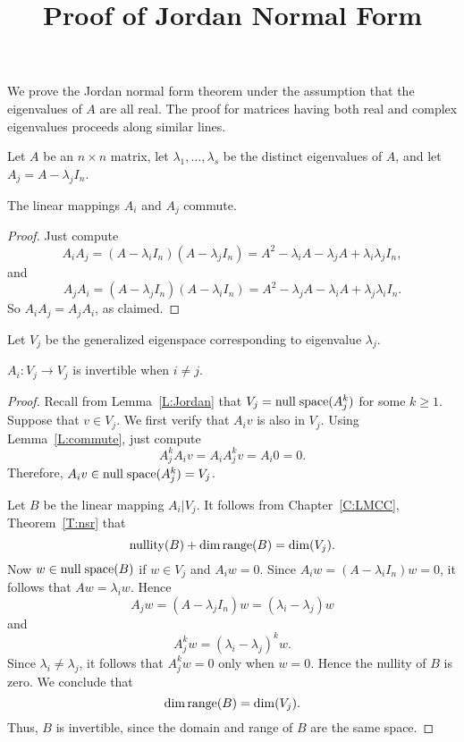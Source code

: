 \documentclass{ximera}
\title{Proof of Jordan Normal Form}
\begin{document}
\begin{abstract}
\end{abstract}
\maketitle


\label{S:Jordan} 

We prove the Jordan normal form theorem under the assumption that the 
eigenvalues of $A$ are all real.  The proof for matrices having both real and 
complex eigenvalues proceeds along similar lines.

Let $A$ be an $n\times n$ matrix, let $\lambda_1,\ldots,\lambda_s$ be the
distinct eigenvalues of $A$, and let $A_j = A-\lambda_jI_n$.

\begin{lemma}  \label{L:commute}
The linear mappings $A_i$ and $A_j$ commute.
\end{lemma}

\begin{proof} Just compute
\[
A_iA_j = (A-\lambda_iI_n)(A-\lambda_jI_n)= A^2-\lambda_iA-\lambda_jA+
\lambda_i\lambda_jI_n,
\]
and
\[
A_jA_i = (A-\lambda_jI_n)(A-\lambda_iI_n)= A^2-\lambda_jA-\lambda_iA+
\lambda_j\lambda_iI_n.
\]
So $A_iA_j=A_jA_i$, as claimed.  \end{proof}

Let $V_j$ be the generalized eigenspace corresponding to eigenvalue 
$\lambda_j$. 

\begin{lemma}  \label{L:Ajinvertible}
$A_i:V_j\to V_j$ is invertible when $i\neq j$.
\end{lemma}

\begin{proof}  Recall from Lemma~\ref{L:Jordan} that $V_j={\rm null\;space}(A_j^k)$ for some 
$k\ge 1$.  Suppose that $v\in V_j$.  We first verify that $A_iv$ is also in 
$V_j$.  Using Lemma~\ref{L:commute}, just compute 
\[
A_j^kA_iv = A_iA_j^kv = A_i0 = 0.
\]
Therefore, $A_iv\in{\rm null\;space}(A_j^k)=V_j$.
 
Let $B$ be the linear mapping $A_i|V_j$.  It follows from
Chapter~\ref{C:LMCC}, Theorem~\ref{T:nsr} that
\[
{\rm nullity}(B) +\dim{\rm range}(B) = \dim(V_j).
\]
Now $w\in{\rm null\;space}(B)$ if $w\in V_j$ and $A_iw=0$.  Since
$A_iw = (A-\lambda_iI_n)w = 0$, it follows that $Aw = \lambda_iw$.  Hence 
\[
A_jw = (A-\lambda_jI_n)w = (\lambda_i-\lambda_j)w
\]
and
\[
A_j^kw = (\lambda_i-\lambda_j)^kw.
\]
Since $\lambda_i\neq\lambda_j$, it follows that $A_j^kw=0$ only when $w=0$.
Hence the nullity of $B$ is zero.  We conclude that
\[
\dim{\rm range}(B) = \dim(V_j).
\]
Thus, $B$ is invertible, since the domain and range of $B$ are the same
space.  \end{proof}
\end{document}
